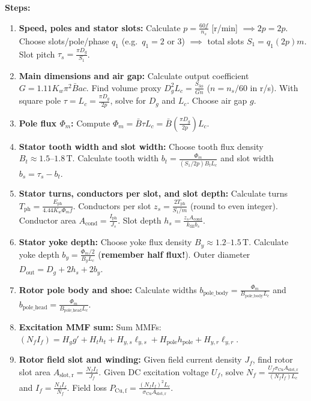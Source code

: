 \textbf{Steps:}
\begin{enumerate}
  \item \textbf{Speed, poles and stator slots:}
  Calculate $p = \frac{60 f}{n_s}$ [r/min] $\implies 2p = 2p$.
  Choose slots/pole/phase $q_1$ (e.g.\ $q_1 = 2$ or 3) $\implies$ total slots $S_1 = q_1 (2p) m$.
  Slot pitch $\tau_s = \frac{\pi D_g}{S_1}$.
  \item \textbf{Main dimensions and air gap:}
  Calculate output coefficient $G = 1.11 K_w \pi^2 \bar{B} ac$.
  Find volume proxy $D_g^2 L_c = \frac{S_{3\phi}}{G n}$ ($n = n_s/60$ in r/s).
  With square pole $\tau = L_c = \frac{\pi D_g}{2p}$, solve for $D_g$ and $L_c$. Choose air gap $g$.
  \item \textbf{Pole flux $\Phi_m$:}
  Compute $\Phi_m = \bar{B} \tau L_c = \bar{B}\left(\frac{\pi D_g}{2p}\right)L_c$.
  \item \textbf{Stator tooth width and slot width:}
  Choose tooth flux density $B_t \approx 1.5\text{--}1.8\,\mathrm{T}$.
  Calculate tooth width $b_t = \frac{\Phi_m}{(S_1/2p) B_t L_c}$ and slot width $b_s = \tau_s - b_t$.
  \item \textbf{Stator turns, conductors per slot, and slot depth:}
  Calculate turns $T_{\mathrm{ph}} = \frac{E_{\mathrm{ph}}}{4.44 K_w \Phi_m f}$.
  Conductors per slot $z_s = \frac{2 T_{\mathrm{ph}}}{S_1 / m}$ (round to even integer).
  Conductor area $A_{\mathrm{cond}} = \frac{I_{\mathrm{ph}}}{J_s}$.
  Slot depth $h_s = \frac{z_s A_{\mathrm{cond}}}{k_{\mathrm{fill}} b_s}$.
  \item \textbf{Stator yoke depth:}
  Choose yoke flux density $B_y \approx 1.2\text{--}1.5\,\mathrm{T}$.
  Calculate yoke depth $b_y = \frac{\Phi_m / 2}{B_y L_c}$ (\textbf{remember half flux!}).
  Outer diameter $D_{\mathrm{out}} = D_g + 2 h_s + 2 b_y$.
  \item \textbf{Rotor pole body and shoe:}
  Calculate widths $b_{\mathrm{pole\_body}} = \frac{\Phi_m}{B_{\mathrm{pole\_body}} L_c}$ and $b_{\mathrm{pole\_head}} = \frac{\Phi_m}{B_{\mathrm{pole\_head}} L_c}$.
  \item \textbf{Excitation MMF sum:}
  Sum MMFs: $(N_f I_f) = H_g g' + H_t h_t + H_{y,s} \ell_{y,s} + H_{\mathrm{pole}} h_{\mathrm{pole}} + H_{y,r} \ell_{y,r}$.
  \item \textbf{Rotor field slot and winding:}
  Given field current density $J_f$, find rotor slot area $A_{\mathrm{slot,r}} = \frac{N_f I_f}{J_f}$.
  Given DC excitation voltage $U_f$, solve $N_f = \frac{U_f \sigma_{\mathrm{Cu}} A_{\mathrm{slot,r}}}{(N_f I_f) L_c}$ and $I_f = \frac{N_f I_f}{N_f}$.
  Field loss $P_{\mathrm{Cu,f}} = \frac{(N_f I_f)^2 L_c}{\sigma_{\mathrm{Cu}} A_{\mathrm{slot,r}}}$.
\end{enumerate}

